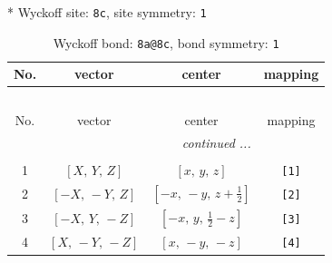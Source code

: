 \documentclass[fleqn,8pt]{jsarticle}
\begin{document}
* Wyckoff site: {\tt 8c}, site symmetry: {\tt 1}
\renewcommand{\arraystretch}{1.2}
\begin{longtable}{cccc}
\caption{Wyckoff bond: {\tt 8a@8c}, bond symmetry: {\tt 1}}
 \\
 \hline \hline
No. & vector & center & mapping \\ \hline \endfirsthead

\multicolumn{3}{l}{\tablename\ \thetable{}} \\
 \hline \hline
No. & vector & center & mapping \\ \hline \endhead

 \hline \hline
\multicolumn{3}{r}{\footnotesize\it continued ...} \\ \endfoot

 \hline \hline
\multicolumn{3}{r}{} \\ \endlastfoot

1 & $\left[ X,\, Y,\, Z \right]$ & $\left[ x,\, y,\, z \right]$ & {\tt [1]} \\ \hline
2 & $\left[ - X,\, - Y,\, Z \right]$ & $\left[ - x,\, - y,\, z + \frac{1}{2} \right]$ & {\tt [2]} \\ \hline
3 & $\left[ - X,\, Y,\, - Z \right]$ & $\left[ - x,\, y,\, \frac{1}{2} - z \right]$ & {\tt [3]} \\ \hline
4 & $\left[ X,\, - Y,\, - Z \right]$ & $\left[ x,\, - y,\, - z \right]$ & {\tt [4]} \\
\end{longtable}
\end{document}
